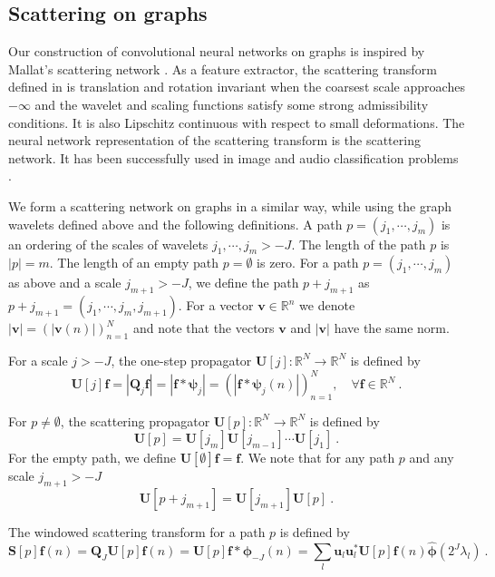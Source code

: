\documentclass{article}
\def\l{\lambda}
\def\RR{\mathbb{R}}
\def\BQ{\boldsymbol{Q}}
\def\BS{\boldsymbol{S}}
\def\BU{\boldsymbol{U}}
\def\Bf{\boldsymbol{f}}
\def\Bu{\boldsymbol{u}}
\def\Bv{\boldsymbol{v}}
\newcommand{\abs}[1]{\left| #1 \right|}
\begin{document}
\subsection{Scattering on graphs}\label{sec:scattering}
Our construction of convolutional neural networks on graphs is inspired by Mallat's scattering network \cite{Mal13}. As a feature extractor, the scattering transform defined in \cite{Mal13} is translation and rotation invariant when the coarsest scale approaches $-\infty$ and the wavelet and scaling functions satisfy some strong admissibility conditions. It is also Lipschitz continuous with respect to small deformations. The neural network representation of the scattering transform is the scattering network. It has been successfully used in image and audio classification problems \cite{BruM13}. 

We form a scattering network on graphs in a similar way, while using the graph wavelets defined above and the following definitions. A path $p = (j_1, \cdots, j_m)$ is an ordering of the scales of wavelets $j_1, \cdots, j_m > -J$. The length of the path $p$ is $\abs{p} = m$. The length of an empty path $p = \emptyset$ is zero. For a path $p = (j_1, \cdots, j_m)$ as above and a scale $j_{m+1} > -J$, we define the path $p +j_{m+1}$ as $p + j_{m+1} = (j_1, \cdots, j_m, j_{m+1})$. For a vector $\Bv \in \RR^n$ we denote $\abs{\Bv} = \left( \abs{\Bv(n)} \right)_{n=1}^N$ and note that the vectors $\Bv$ and $\abs{\Bv}$ have the same norm. 

For a scale $j > -J$, the one-step propagator $\BU[j]: \RR^N \rightarrow \RR^N$ is defined by
\begin{equation}\label{eq:defujf}
\BU[j]\Bf = \abs{\BQ_j \Bf} = \abs{\Bf \ast \boldsymbol{\psi}_j} = \left( \abs{\Bf \ast \boldsymbol{\psi}_j(n)} \right)_{n=1}^N , \quad \forall \Bf \in \RR^N ~.
\end{equation}


For $p \neq \emptyset$, the scattering propagator $\BU[p]: \RR^N \rightarrow \RR^N$ is defined by
\begin{equation}\label{eq:defUp}
\BU[p] = \BU[j_m] \BU[j_{m-1}] \cdots \BU[j_1] ~.
\end{equation}
For the empty path, we define $\BU[\emptyset] \Bf = \Bf$. We note that for any path $p$ and any scale $j_{m+1}>-J$ 
\begin{equation}\label{eq:pathappend}
\BU[p+j_{m+1}] = \BU[j_{m+1}] \BU[p] ~.
\end{equation}

The windowed scattering transform for a path $p$ is defined by
\begin{equation}\label{eq:defSf}
\BS[p]\Bf(n) = \BQ_J \BU[p]\Bf(n) = \BU[p]\Bf \ast \boldsymbol{\phi}_{-J} (n) = \sum_l \Bu_l \Bu_l^* \BU[p]\Bf(n) \hat{\boldsymbol{\phi}}(2^J \l_l) ~.
\end{equation}
\end{document}
